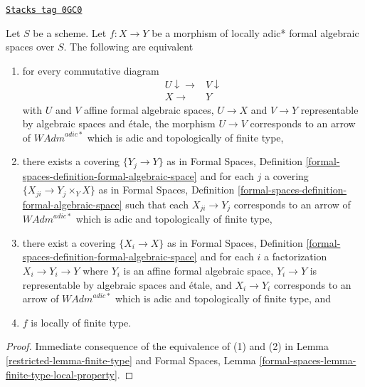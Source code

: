 \begin{lemma}
\label{restricted-lemma-finite-type-morphisms}
\href{https://stacks.math.columbia.edu/tag/0GC0}{\texttt{Stacks tag 0GC0}}

Let $S$ be a scheme. Let $f : X \to Y$ be a morphism of
locally adic* formal algebraic spaces over $S$.
The following are equivalent
\begin{enumerate}
\item for every commutative diagram
$$
\begin{array}{cc}U \downarrow\longrightarrow & V \downarrow \\ X \longrightarrow & Y\end{array}
$$
with $U$ and $V$ affine formal algebraic spaces, $U \to X$ and $V \to Y$
representable by algebraic spaces and \'etale, the morphism $U \to V$
corresponds to an arrow of $\textit{WAdm}^{adic*}$ which is
adic and topologically of finite type,
\item there exists a covering $\{Y_j \to Y\}$ as in
Formal Spaces,
Definition \ref{formal-spaces-definition-formal-algebraic-space}
and for each $j$
a covering $\{X_{ji} \to Y_j \times_Y X\}$ as in
Formal Spaces,
Definition \ref{formal-spaces-definition-formal-algebraic-space}
such that each $X_{ji} \to Y_j$  corresponds
to an arrow of $\textit{WAdm}^{adic*}$ which is adic and
topologically of finite type,
\item there exist a covering $\{X_i \to X\}$ as in
Formal Spaces,
Definition \ref{formal-spaces-definition-formal-algebraic-space}
and for each $i$ a factorization $X_i \to Y_i \to Y$ where $Y_i$
is an affine formal algebraic space, $Y_i \to Y$ is representable
by algebraic spaces and \'etale, and $X_i \to Y_i$ corresponds
to an arrow of $\textit{WAdm}^{adic*}$ which is adic and topologically
of finite type, and
\item $f$ is locally of finite type.
\end{enumerate}
\end{lemma}

\begin{proof}

Immediate consequence of the equivalence of (1) and (2) in
Lemma \ref{restricted-lemma-finite-type} and
Formal Spaces, Lemma
\ref{formal-spaces-lemma-finite-type-local-property}.
\end{proof}

